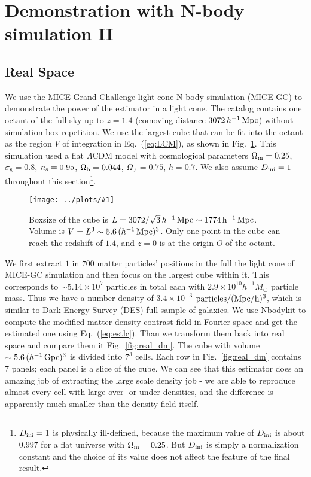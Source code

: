 \documentclass[prd,amsmath,amssymb,floatfix,superscriptaddress,nofootinbib,twocolumn]{revtex4-1}
\newcommand{\ini}{\rm ini}
\newcommand{\ec}[1]{Eq.~(\ref{eq:#1})}
\newcommand{\rf}[1]{\ref{fig:#1}}
\newcommand{\sfig}[2]{
\texttt{[image: ../plots/\#1]}
        }
\newcommand{\Sfig}[2]{
   \begin{figure}[thbp]
   \begin{center}
    \sfig{../plots/#1.pdf}{\columnwidth}
    \caption{{\small #2}}
    \label{fig:#1}
     \end{center}
   \end{figure}
}
\begin{document}
\section{Demonstration with N-body simulation II} \label{sec6}
\subsection{Real Space}
\noindent We use the MICE Grand Challenge light cone N-body simulation (MICE-GC) to demonstrate the power of the estimator in a light cone. The catalog contains one octant of the full sky up to $z = 1.4$ (comoving distance $3072\, h^{-1}\, \rm Mpc$) without simulation box repetition. We use the largest cube that can be fit into the octant as the region $V$ of integration in \ec{LCM}, as shown in Fig.~\rf{Cube}. This simulation used a flat $\Lambda$CDM model with cosmological parameters $ \Omega_{\rm m}=0.25$, $\sigma_8 = 0.8$, $n_{\rm s}=0.95$, $\Omega_{\rm b}=0.044$, $\Omega_{\Lambda}=0.75$, $h=0.7$. We also assume $D_{\ini}=1$ throughout this section\footnote{$D_{\rm ini}=1$ is physically ill-defined, because the maximum value of $D_{\rm ini}$ is about $0.997$ for a flat universe with $\Omega_{\rm m}=0.25$. But $D_{\rm ini}$ is simply a normalization constant and the choice of its value does not affect the feature of the final result.}. 

\Sfig{Cube}{Boxsize of the cube is $L=3072/\sqrt{3}\, h^{-1}\, \rm Mpc\sim 1774\, h^{-1}\, \rm Mpc$. Volume is $V=L^3\sim 5.6\,(h^{-1}\,\rm Mpc)^3$. Only one point in the cube can reach the redshift of $1.4$, and $z=0$ is at the origin $O$ of the octant.}

We first extract $1$ in $700$  matter particles' positions in the full the light cone of MICE-GC simulation and then focus on the largest cube within it. This corresponds to $\sim 5.14\times 10^{7}$ particles in total each with $2.9\times 10^{10} h^{-1}M_{\odot}$ particle mass. Thus we have a number density of $3.4\times 10^{-3}$ $\rm particles/(Mpc/h)^3$, which is similar to Dark Energy Survey (DES) \cite{DES:2016DES} full sample of galaxies. We use Nbodykit \cite{Hand:2018nby} to compute the modified matter density contrast field in Fourier space and get the estimated one using \ec{estlc}. Than we transform them back into real space and compare them it Fig.~\rf{real_dm}. The cube with volume $\sim5.6\,(h^{-1}\,\rm Gpc)^3$ is divided into $7^3$ cells. Each row in Fig.~\rf{real_dm} contains 7 panels; each panel is a slice of the cube. We can see that this estimator does an amazing job of extracting the large scale density job - we are able to reproduce almost every cell with large over- or under-densities, and the difference is apparently much smaller than the density field itself.
\end{document}
